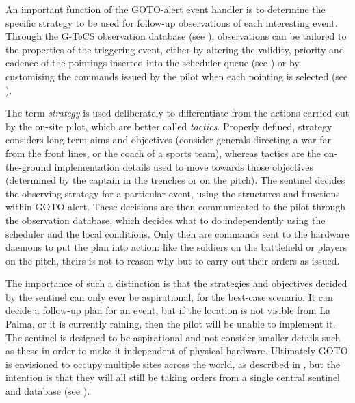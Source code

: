 \begin{colsection}

An important function of the GOTO-alert event handler is to determine the specific strategy to be used for follow-up observations of each interesting event. Through the G-TeCS observation database (see ), observations can be tailored to the properties of the triggering event, either by altering the validity, priority and cadence of the pointings inserted into the scheduler queue (see ) or by customising the commands issued by the pilot when each pointing is selected (see ).

The term \emph{strategy} is used deliberately to differentiate from the actions carried out by the on-site pilot, which are better called \emph{tactics}. Properly defined, strategy considers long-term aims and objectives (consider generals directing a war far from the front lines, or the coach of a sports team), whereas tactics are the on-the-ground implementation details used to move towards those objectives (determined by the captain in the trenches or on the pitch). The sentinel decides the observing strategy for a particular event, using the structures and functions within GOTO-alert. These decisions are then communicated to the pilot through the observation database, which decides what to do independently using the scheduler and the local conditions. Only then are commands sent to the hardware daemons to put the plan into action: like the soldiers on the battlefield or players on the pitch, theirs is not to reason why but to carry out their orders as issued.

The importance of such a distinction is that the strategies and objectives decided by the sentinel can only ever be aspirational, for the best-case scenario. It can decide a follow-up plan for an event, but if the location is not visible from La Palma, or it is currently raining, then the pilot will be unable to implement it. The sentinel is designed to be aspirational and not consider smaller details such as these in order to make it independent of physical hardware. Ultimately GOTO is envisioned to occupy multiple sites across the world, as described in , but the intention is that they will all still be taking orders from a single central sentinel and database (see ).

\end{colsection}



